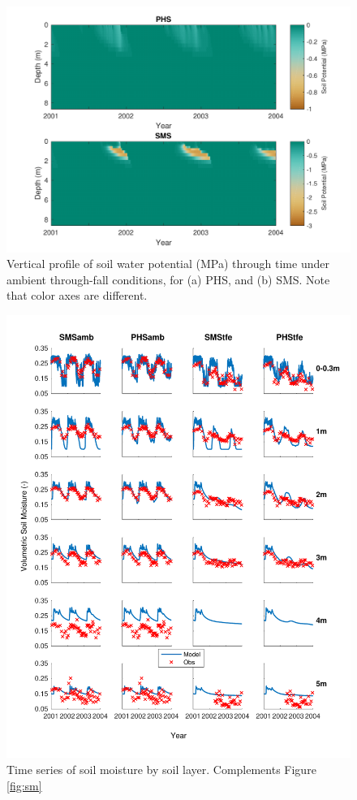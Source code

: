 \documentclass[draft,linenumbers]{agujournal}
\begin{document}
  
        \clearpage
    \begin{figure}[h]
     \centering
     \includegraphics[width=30pc]{../figs2/suppsmp.pdf}
     \caption{Vertical profile of soil water potential (MPa) through time under ambient through-fall conditions, for
     (a) PHS, and 
     (b) SMS.
     Note that color axes are different. }
     \label{supp:sm}
  \end{figure}
  

    \begin{figure}[h]
     \centering
     \includegraphics[width=30pc]{../figs3/suppsm2.pdf}
     \caption{Time series of soil moisture by soil layer.
     Complements Figure \ref{fig:sm}}
     \label{supp:sm2}
  \end{figure}
          \clearpage
          
\end{document}
